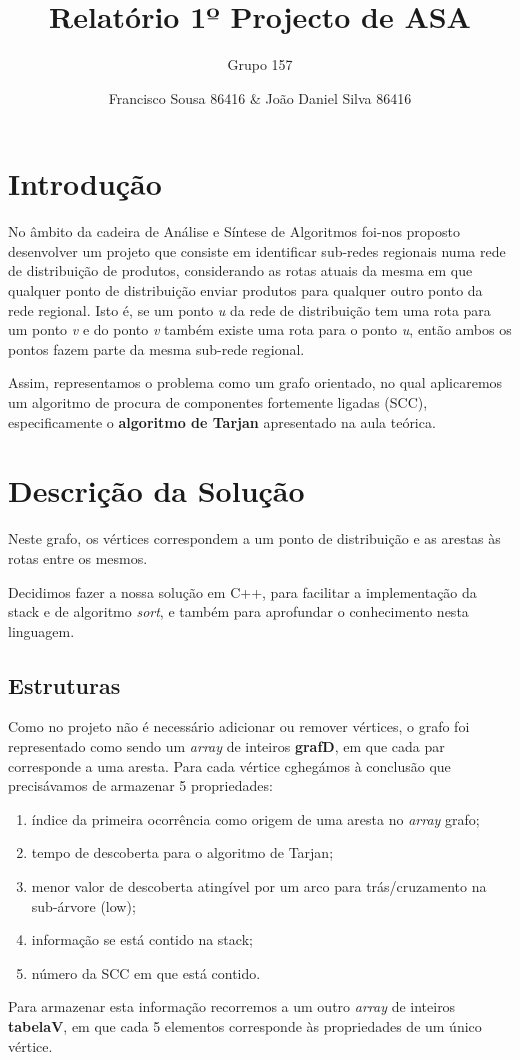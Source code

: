 \documentclass[12pt,a4paper]{article}
\author{Grupo 157 \and Francisco Sousa 86416 \& João Daniel Silva 86416}
\title{Relatório 1º Projecto de ASA}
\begin{document}
\maketitle

\section{Introdução}
No âmbito da cadeira de Análise e Síntese de Algoritmos foi-nos proposto desenvolver um projeto que consiste em identificar sub-redes regionais numa rede de distribuição
de produtos, considerando as rotas atuais da mesma em que qualquer ponto de distribuição enviar produtos para qualquer outro ponto da rede regional. Isto é, se um ponto \textit{u}
da rede de distribuição tem uma rota para um ponto \textit{v} e do ponto \textit{v} também existe uma rota para o ponto \textit{u}, então ambos os pontos fazem parte da mesma sub-rede regional.

Assim, representamos o problema como um grafo orientado, no qual aplicaremos um algoritmo de procura de componentes fortemente ligadas (SCC), especificamente o \textbf{algoritmo de Tarjan} apresentado na aula teórica.
\section{Descrição da Solução}
Neste grafo, os vértices correspondem a um ponto de distribuição e as arestas às rotas entre os mesmos.

Decidimos fazer a nossa solução em C++, para facilitar a implementação da stack e de algoritmo \textit{sort}, e também para aprofundar o conhecimento nesta linguagem.

\subsection{Estruturas}
Como no projeto não é necessário adicionar ou remover vértices, o grafo foi representado como sendo um \textit{array} de inteiros \textbf{grafD}, em que cada par corresponde a uma aresta.
Para cada vértice cghegámos à conclusão que precisávamos de armazenar 5 propriedades:
\begin{enumerate}
	\item índice da primeira ocorrência como origem de uma aresta no \textit{array} grafo;
	\item tempo de descoberta para o algoritmo de Tarjan;
	\item menor valor de descoberta atingível por um arco para trás/cruzamento na sub-árvore (low);
	\item informação se está contido na stack;
	\item número da SCC em que está contido.
\end{enumerate}
Para armazenar esta informação recorremos a um outro \textit{array} de inteiros \textbf{tabelaV}, em que cada 5 elementos corresponde às propriedades de um único vértice.
\end{document}
